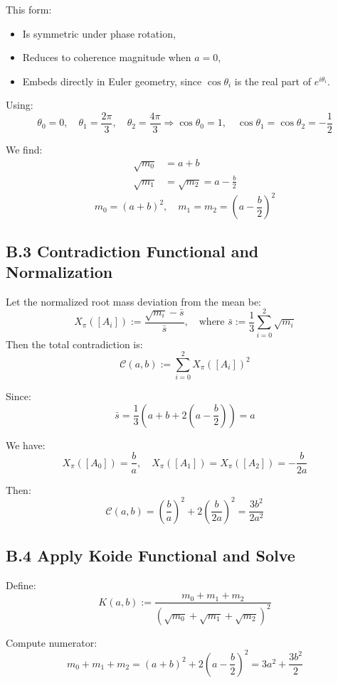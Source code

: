 This form:
\begin{itemize}
    \item Is symmetric under phase rotation,
    \item Reduces to coherence magnitude when $a = 0$,
    \item Embeds directly in Euler geometry, since $\cos \theta_i$ is the real part of $e^{i\theta_i}$.
\end{itemize}

Using:
\[
\theta_0 = 0,\quad \theta_1 = \frac{2\pi}{3},\quad \theta_2 = \frac{4\pi}{3}
\Rightarrow
\cos \theta_0 = 1,\quad \cos \theta_1 = \cos \theta_2 = -\frac{1}{2}
\]

We find:
\begin{align*}
\sqrt{m_0} &= a + b \\
\sqrt{m_1} &= \sqrt{m_2} = a - \frac{b}{2}
\end{align*}
\[
m_0 = (a + b)^2,\quad m_1 = m_2 = \left( a - \frac{b}{2} \right)^2
\]

\subsection*{B.3 Contradiction Functional and Normalization}

\begin{definition}
Let the normalized root mass deviation from the mean be:
\[
X_\pi([A_i]) := \frac{\sqrt{m_i} - \bar{s}}{\bar{s}},\quad \text{where } \bar{s} := \frac{1}{3} \sum_{i=0}^2 \sqrt{m_i}
\]
Then the total contradiction is:
\[
\mathcal{C}(a, b) := \sum_{i=0}^2 X_\pi([A_i])^2
\]
\end{definition}

Since:
\[
\bar{s} = \frac{1}{3} \left( a + b + 2(a - \frac{b}{2}) \right) = a
\]

We have:
\[
X_\pi([A_0]) = \frac{b}{a},\quad
X_\pi([A_1]) = X_\pi([A_2]) = -\frac{b}{2a}
\]

Then:
\[
\mathcal{C}(a, b) = \left( \frac{b}{a} \right)^2 + 2 \left( \frac{b}{2a} \right)^2 = \frac{3b^2}{2a^2}
\]

\subsection*{B.4 Apply Koide Functional and Solve}

Define:
\[
K(a, b) := \frac{m_0 + m_1 + m_2}{\left( \sqrt{m_0} + \sqrt{m_1} + \sqrt{m_2} \right)^2}
\]

Compute numerator:
\[
m_0 + m_1 + m_2 = (a + b)^2 + 2 \left( a - \frac{b}{2} \right)^2 = 3a^2 + \frac{3b^2}{2}
\]

